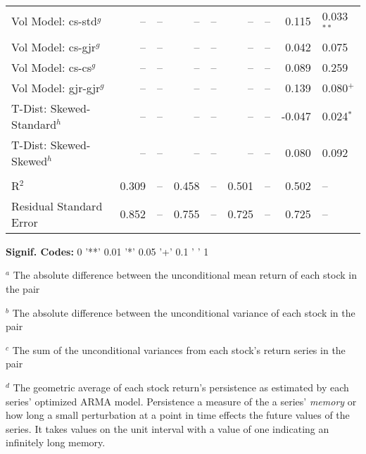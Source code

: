 \documentclass[12pt]{report}
\begin{document}
\begin{table}
\begin{tabular}{l r l r l r l r l}
        Vol Model: cs-std$^{g}$            &     -- & --            &      -- & --           &      -- & --            &   0.115 & 0.033$^{**}$  \\
        Vol Model: cs-gjr$^{g}$            &     -- & --            &      -- & --           &      -- & --            &   0.042 & 0.075         \\
        Vol Model: cs-cs$^{g}$             &     -- & --            &      -- & --           &      -- & --            &   0.089 & 0.259         \\
        Vol Model: gjr-gjr$^{g}$           &     -- & --            &      -- & --           &      -- & --            &   0.139 & 0.080$^{+}$   \\
        T-Dist: Skewed-Standard$^{h}$      &     -- & --            &      -- & --           &      -- & --            &  -0.047 & 0.024$^{*}$   \\
        T-Dist: Skewed-Skewed$^{h}$        &     -- & --            &      -- & --           &      -- & --            &   0.080 & 0.092         \\  \\
        R$^{2}$                            &  0.309 & --            &   0.458 & --           &   0.501 & --            &   0.502 & --            \\
        Residual Standard Error            &  0.852 & --            &   0.755 & --           &   0.725 & --            &   0.725 & --            \\
        \midrule
    \end{tabular}
    \begin{tablenotes}
        \item{\footnotesize \textbf{Signif. Codes:} 0 '**' 0.01 '*' 0.05 '+' 0.1 ' ' 1}
        \item {$^{a}$ The absolute difference between the unconditional mean return of each stock in the pair}
        \item {$^{b}$ The absolute difference between the unconditional variance of each stock in the pair}
        \item {$^{c}$ The sum of the unconditional variances from each stock's return series in the pair}
        \item {$^{d}$ The geometric average of each stock return's persistence as estimated by each series' optimized ARMA model. Persistence a measure of the a series' \textit{memory} or how long a small perturbation at a point in time effects the future values of the series. It takes values on the unit interval with a value of one indicating an infinitely long memory.}

\end{tablenotes}
\end{table}
\end{document}
